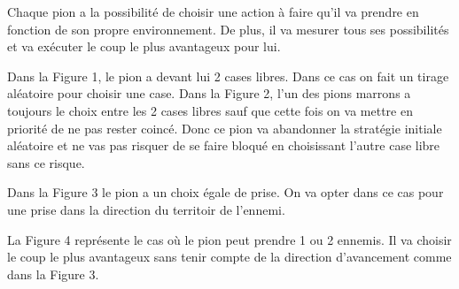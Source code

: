 \documentclass[11pt]{article} %
\begin{document}
Chaque pion a la possibilité de choisir une action à faire qu’il va prendre en fonction de son propre environnement. De plus, il va mesurer tous ses possibilités et va exécuter le coup le plus avantageux pour lui. 

Dans la Figure 1, le pion a devant lui 2 cases libres. Dans ce cas on fait un tirage aléatoire pour choisir une case. 
Dans la Figure 2, l’un des pions marrons a toujours le choix entre les 2 cases libres sauf que cette fois on va mettre en priorité de ne pas rester coincé. Donc ce pion va abandonner la stratégie initiale aléatoire et ne vas pas risquer de se faire bloqué en choisissant l’autre case libre sans ce risque.

Dans la Figure 3 le pion a un choix égale de prise. On va opter dans ce cas pour une prise dans la direction du territoir de l’ennemi.

La Figure 4 représente le cas où le pion peut prendre 1 ou 2 ennemis. Il va choisir le coup le plus avantageux sans tenir compte de la direction d'avancement comme dans la Figure 3. 
 
\end{document}

